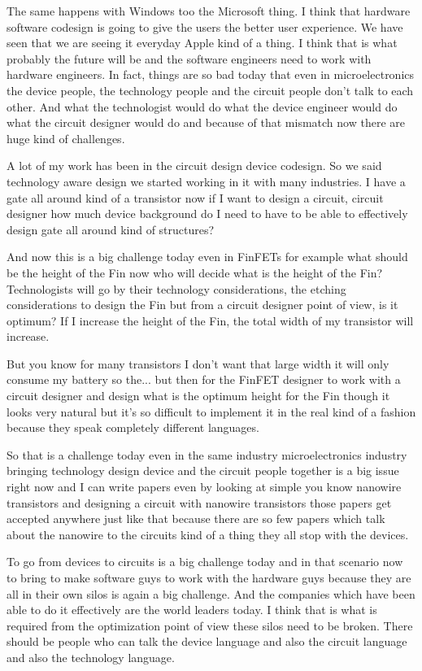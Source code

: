 The same happens with Windows too the Microsoft thing. I think that hardware software codesign is going to give the users the better user experience. We have seen that we are seeing it everyday Apple kind of a thing. I think that is what probably the future will be and the software engineers need to work with hardware engineers. In fact, things are so bad today that even in microelectronics the device people, the technology people and the circuit people don’t talk to each other. And what the technologist would do what the device engineer would do what the circuit designer would do and because of that mismatch now there are huge kind of challenges.

A lot of my work has been in the circuit design device codesign. So we said technology aware design we started working in it with many industries. I have a gate all around kind of a transistor now if I want to design a circuit, circuit designer how much device background do I need to have to be able to effectively design gate all around kind of structures? 

And now this is a big challenge today even in FinFETs for example what should be the height of the Fin now who will decide what is the height of the Fin? Technologists will go by their technology considerations, the etching considerations to design the Fin but from a circuit designer point of view, is it optimum? If I increase the height of the Fin, the total width of my transistor will increase.

But you know for many transistors I don’t want that large width it will only consume my battery so the... but then for the FinFET designer to work with a circuit designer and design what is the optimum height for the Fin though it looks very natural but it’s so difficult to implement it in the real kind of a fashion because they speak completely different languages.

So that is a challenge today even in the same industry microelectronics industry bringing technology design device and the circuit people together is a big issue right now and I can write papers even by looking at simple you know nanowire transistors and designing a circuit with nanowire transistors those papers get accepted anywhere just like that because there are so few papers which talk about the nanowire to the circuits kind of a thing they all stop with the devices.

To go from devices to circuits is a big challenge today and in that scenario now to bring to make software guys to work with the hardware guys because they are all in their own silos is again a big challenge. And the companies which have been able to do it effectively are the world leaders today. I think that is what is required from the optimization point of view these silos need to be broken. There should be people who can talk the device language and also the circuit language and also the technology language.

